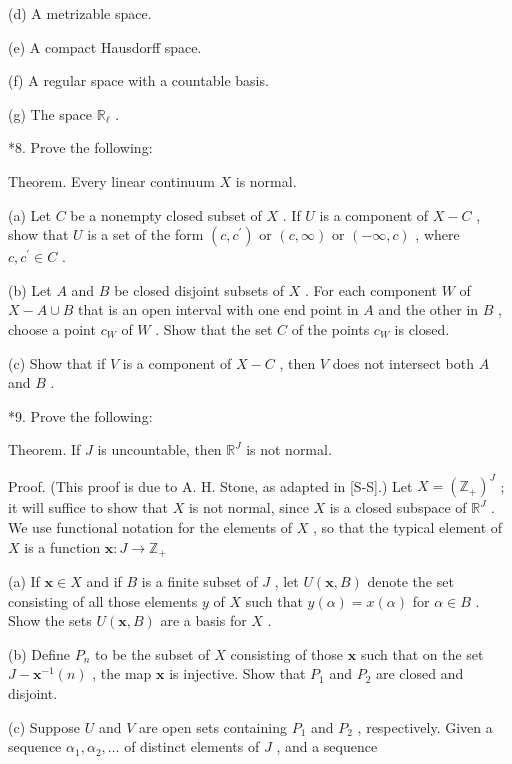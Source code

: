 \documentclass[10pt]{article}
\begin{document}
(d) A metrizable space.

(e) A compact Hausdorff space.

(f) A regular space with a countable basis.

(g) The space \({\mathbb{R}}_{\ell }\) .

*8. Prove the following:

Theorem. Every linear continuum \(X\) is normal.

(a) Let \(C\) be a nonempty closed subset of \(X\) . If \(U\) is a component of \(X - C\) , show that \(U\) is a set of the form \(\left( {c,{c}^{\prime }}\right)\) or \(\left( {c,\infty }\right)\) or \(\left( {-\infty ,c}\right)\) , where \(c,{c}^{\prime } \in  C\) .

(b) Let \(A\) and \(B\) be closed disjoint subsets of \(X\) . For each component \(W\) of \(X - A \cup  B\) that is an open interval with one end point in \(A\) and the other in \(B\) , choose a point \({c}_{W}\) of \(W\) . Show that the set \(C\) of the points \({c}_{W}\) is closed.

(c) Show that if \(V\) is a component of \(X - C\) , then \(V\) does not intersect both \(A\) and \(B\) .

*9. Prove the following:

Theorem. If \(J\) is uncountable, then \({\mathbb{R}}^{J}\) is not normal.

Proof. (This proof is due to A. H. Stone, as adapted in [S-S].) Let \(X = {\left( {\mathbb{Z}}_{ + }\right) }^{J}\) ; it will suffice to show that \(X\) is not normal, since \(X\) is a closed subspace of \({\mathbb{R}}^{J}\) . We use functional notation for the elements of \(X\) , so that the typical element of \(X\) is a function \(\mathbf{x} : J \rightarrow  {\mathbb{Z}}_{ + }\)

(a) If \(\mathbf{x} \in  X\) and if \(B\) is a finite subset of \(J\) , let \(U\left( {\mathbf{x},B}\right)\) denote the set consisting of all those elements \(y\) of \(X\) such that \(y\left( \alpha \right)  = x\left( \alpha \right)\) for \(\alpha  \in  B\) . Show the sets \(U\left( {\mathbf{x},B}\right)\) are a basis for \(X\) .

(b) Define \({P}_{n}\) to be the subset of \(X\) consisting of those \(\mathbf{x}\) such that on the set \(J - {\mathbf{x}}^{-1}\left( n\right)\) , the map \(\mathbf{x}\) is injective. Show that \({P}_{1}\) and \({P}_{2}\) are closed and disjoint.

(c) Suppose \(U\) and \(V\) are open sets containing \({P}_{1}\) and \({P}_{2}\) , respectively. Given a sequence \({\alpha }_{1},{\alpha }_{2},\ldots\) of distinct elements of \(J\) , and a sequence
\end{document}
